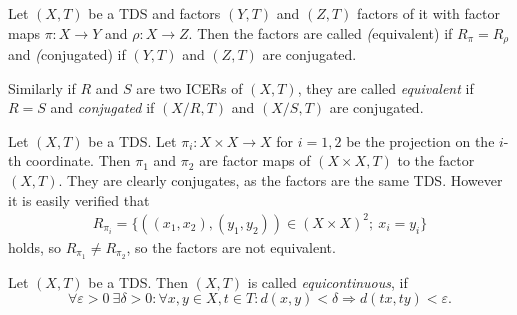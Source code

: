 \begin{definition}
	Let $(X, T)$ be a TDS and factors $(Y, T)$ and $(Z, T)$ factors of it with factor maps $\pi: X \to Y$ and $\rho: X \to Z$.	Then the factors are called \emph(equivalent) if $R_\pi = R_\rho$ and \emph(conjugated) if $(Y, T)$ and $(Z, T)$ are conjugated.
	
	Similarly if $R$ and $S$ are two ICERs of $(X, T)$, they are called \emph{equivalent} if $R = S$ and \emph{conjugated} if $(X/R, T)$ and $(X/S, T)$ are conjugated.
\end{definition}

\begin{example}
	Let $(X, T)$ be a TDS. Let $\pi_i: X \times X \to X$ for $i = 1, 2$ be the projection on the $i$-th coordinate. Then $\pi_1$ and $\pi_2$ are factor maps of $(X \times X, T)$ to the factor $(X, T)$. They are clearly conjugates, as the factors are the same TDS. However it is easily verified that
	\begin{align*}
		R_{\pi_i} = \{((x_1, x_2), (y_1, y_2)) \in (X \times X)^2;\ x_i = y_i\}
	\end{align*}
	holds, so $R_{\pi_1} \neq R_{\pi_2}$, so the factors are not equivalent.
\end{example}

\begin{definition}
	Let $(X,T)$ be a TDS. Then $(X,T)$ is called \emph{equicontinuous}, if
	\begin{equation*}
		\forall \varepsilon > 0\ \exists \delta > 0: \forall x , y \in X, t \in T:  d(x, y) < \delta  \Rightarrow d(tx, ty) < \varepsilon.
	\end{equation*}
\end{definition}

